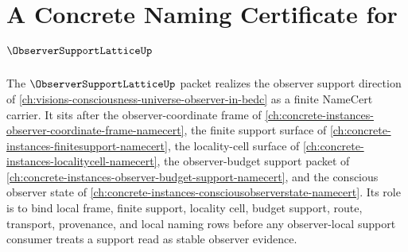 \chapter{A Concrete Naming Certificate for $\ObserverSupportLatticeUp$}
\label{ch:concrete-instances-observer-support-lattice-namecert}

The $\ObserverSupportLatticeUp$ packet realizes the observer support direction of \autoref{ch:visions-consciousness-universe-observer-in-bedc} as a finite NameCert carrier. It sits after the observer-coordinate frame of \autoref{ch:concrete-instances-observer-coordinate-frame-namecert}, the finite support surface of \autoref{ch:concrete-instances-finitesupport-namecert}, the locality-cell surface of \autoref{ch:concrete-instances-localitycell-namecert}, the observer-budget support packet of \autoref{ch:concrete-instances-observer-budget-support-namecert}, and the conscious observer state of \autoref{ch:concrete-instances-consciousobserverstate-namecert}. Its role is to bind local frame, finite support, locality cell, budget support, route, transport, provenance, and local naming rows before any observer-local support consumer treats a support read as stable observer evidence.

